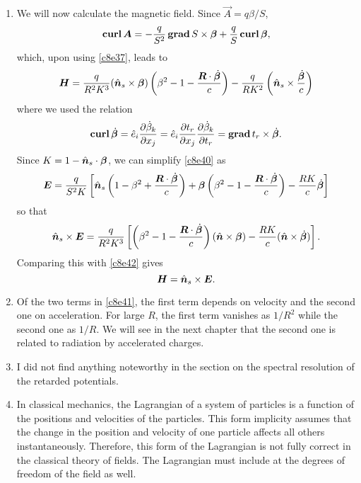 \begin{enumerate}
\item We will now calculate the magnetic field. Since $\vec{A} = q\beta/S$,
\[
\operatorname{\textbf{curl}}\bm{A} = -\frac{q}{S^2}\operatorname{\textbf{grad}} S \times \bm{\beta} + 
\frac{q}{S}\operatorname{\textbf{curl}}\bm{\beta},
\]
which, upon using \eqref{c8e37}, leads to
\begin{equation}\label{c8e42}
\bm{H} = \frac{q}{R^2K^3}(\hat{\bm{n}}_s\times\bm{\beta})
\left(\beta^2 - 1 - \frac{\bm{R}\cdot\dot{\bm{\beta}}}{c}\right) -
\frac{q}{RK^2}\left(\hat{\bm{n}}_s \times \frac{\dot{\bm{\beta}}}{c}\right)
\end{equation}
where we used the relation
\[
\operatorname{\textbf{curl}}\dot{\bm{\beta}} = \hat{e}_i\frac{\partial{\dot{\beta}_k}}{\partial{x_j}} =
\hat{e}_i\frac{\partial{t_r}}{\partial{x_j}}\frac{\partial{\dot{\beta}_k}}{\partial{t_r}} = 
\operatorname{\textbf{grad}}{t_r}\times\dot{\bm{\beta}}.
\]
Since $K = 1 - \hat{\bm{n}}_s\cdot\bm{\beta}$, we can simplify \eqref{c8e40} as
\[
\bm{E} = \frac{q}{S^2K}\left[
\hat{\bm{n}}_s\left(1 - \beta^2 + \frac{\bm{R}\cdot\dot{\bm{\beta}}}{c}\right) +
\bm{\beta}\left(\beta^2 - 1 - \frac{\bm{R}\cdot\dot{\bm{\beta}}}{c}\right)- 
\frac{RK}{c}\dot{\bm{\beta}}\right]
\]
so that
\[
\hat{\bm{n}}_s \times \bm{E} = \frac{q}{R^2K^3}\left[
\left(\beta^2 - 1 - \frac{\bm{R}\cdot\dot{\bm{\beta}}}{c}\right)
(\hat{\bm{n}}\times\bm{\beta}) - \frac{RK}{c}(\hat{\bm{n}}\times\dot{\bm{\beta}})\right].
\]
Comparing this with \eqref{c8e42} gives
\begin{equation}\label{c8e43}
\bm{H} = \hat{\bm{n}}_s \times \bm{E}.
\end{equation}

\item Of the two terms in \eqref{c8e41}, the first term depends on velocity
and the second one on acceleration. For large $R$, the first term vanishes as
$1/R^2$ while the second one as $1/R$. We will see in the next chapter that the
second one is related to radiation by accelerated charges. 

\item I did not find anything noteworthy in the section on the spectral
resolution of the retarded potentials.

\item In classical mechanics, the Lagrangian of a system of particles is a 
function of the positions and velocities of the particles. This form implicity
assumes that the change in the position and velocity of one particle affects 
all others instantaneously. Therefore, this form of the Lagrangian is not fully
correct in the classical theory of fields. The Lagrangian must include at the
degrees of freedom of the field as well.


\end{enumerate}
